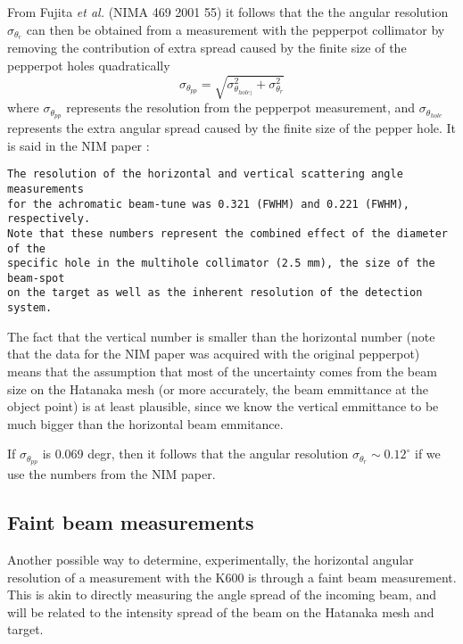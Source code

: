 \documentclass[11pt]{report}
\begin{document}
From Fujita {\it et al.} (NIMA 469 2001 55) it follows that the 
the angular resolution $\sigma_{\theta_{r}}$ 
can then be obtained from 
a measurement with the pepperpot collimator
by removing the contribution of extra spread caused by the finite
size of the pepperpot holes quadratically
\begin{equation} 
	\sigma_{\theta_{pp}}=  \sqrt{ \sigma_{\theta_{hole)}}^2  +\sigma_{\theta_{r}}^2 }
\end{equation} 
where $\sigma_{\theta_{pp}}$ represents the resolution from the pepperpot measurement, and $\sigma_{\theta_{hole}}$ represents the 
extra angular spread caused by the finite size of the pepper hole.  
It is said in the NIM paper \cite{Nev11}:
\begin{verbatim} 
The resolution of the horizontal and vertical scattering angle measurements 
for the achromatic beam-tune was 0.321 (FWHM) and 0.221 (FWHM), respectively. 
Note that these numbers represent the combined effect of the diameter of the 
specific hole in the multihole collimator (2.5 mm), the size of the beam-spot 
on the target as well as the inherent resolution of the detection system.
\end{verbatim} 

The fact that the vertical number is smaller than the horizontal number %
(note that the data for the NIM paper was acquired with the original pepperpot)
means that the assumption that most of the uncertainty comes from the beam size on the Hatanaka mesh (or
more accurately, the beam emmittance at the object point)
is at least plausible, since we know the vertical emmittance to be much bigger than the horizontal beam emmitance.


If $\sigma_{\theta_{pp}}$ is 0.069 degr, then it follows that the angular resolution
$\sigma_{\theta_{r}} \sim 0.12^{\circ}$ if we use the numbers from the NIM paper.

\subsection{Faint beam measurements}

Another possible way to determine, experimentally, the horizontal angular resolution of a measurement with the K600
is through a faint beam measurement.
This is akin to directly measuring the angle spread of the incoming beam, and will be related to the 
intensity spread of the beam on the Hatanaka mesh and target.
\end{document}
